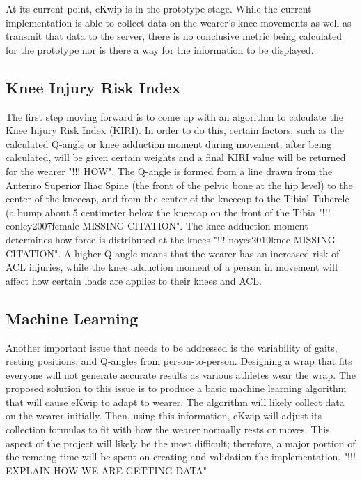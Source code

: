 At its current point, eKwip is in the prototype stage. While the current implementation is able to collect data on the wearer's knee movements as well as transmit that data to the server, there is no conclusive metric being calculated for the prototype nor is there a way for the information to be displayed. 

\subsection {Knee Injury Risk Index}
The first step moving forward is to come up with an algorithm to calculate the Knee Injury Risk Index (KIRI). In order to do this, certain factors, such as the calculated Q-angle or knee adduction moment during movement, after being calculated, will be given certain weights and a final KIRI value will be returned for the wearer "!!! HOW". The Q-angle is formed from a line drawn from the Anteriro Superior Iliac Spine (the front of the pelvic bone at the hip level) to the center of the kneecap, and from the center of the kneecap to the Tibial Tubercle (a bump about 5 centimeter below the kneecap on the front of the Tibia "!!! conley2007female MISSING CITATION". The knee adduction moment determines how force is distributed at the knees "!!! noyes2010knee MISSING CITATION". A higher Q-angle means that the wearer has an increased risk of ACL injuries, while the knee adduction moment of a person in movement will affect how certain loads are applies to their knees and ACL. 

\subsection {Machine Learning}
Another important issue that needs to be addressed is the variability of gaits, resting positions, and Q-angles from person-to-person. Designing a wrap that fits everyone will not generate accurate results as various athletes wear the wrap. The proposed solution to this issue is to produce a basic machine learning algorithm that will cause eKwip to adapt to wearer. The algorithm will likely collect data on the wearer initially. Then, using this information, eKwip will adjust its collection formulas to fit with how the wearer normally rests or moves. This aspect of the project will likely be the most difficult; therefore, a major portion of the remaing time will be spent on creating and validation the implementation. "!!! EXPLAIN HOW WE ARE GETTING DATA"

